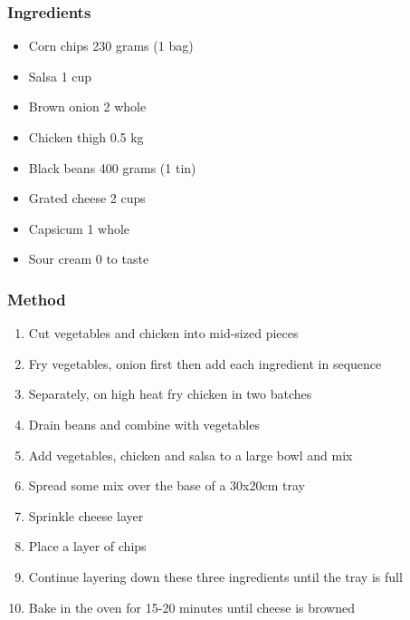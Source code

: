 \documentclass[]{article}
\begin{document}
\subsubsection*{\Large Ingredients}
\begin{multicols}{2}
\begin{itemize}
 \item Corn chips \hfill 230 grams (1 bag)
 \item Salsa \hfill 1 cup
 \item Brown onion \hfill 2 whole
 \item Chicken thigh \hfill 0.5 kg
 \item Black beans \hfill 400 grams (1 tin)
 \item Grated cheese \hfill 2 cups
 \item Capsicum \hfill 1 whole
 \item Sour cream \hfill 0 to taste
\end{itemize}
\end{multicols}
\subsubsection*{\Large Method}
\begin{enumerate}[font=\huge\color{accent}]
	\item Cut vegetables and chicken into mid-sized pieces
	\item Fry vegetables, onion first then add each ingredient in sequence
	\item Separately, on high heat fry chicken in two batches
	\item Drain beans and combine with vegetables
	\item Add vegetables, chicken and salsa to a large bowl and mix
	\item Spread some mix over the base of a 30x20cm tray
	\item Sprinkle cheese layer
	\item Place a layer of chips
	\item Continue layering down these three ingredients until the tray is full
	\item Bake in the oven for 15-20 minutes until cheese is browned
\end{enumerate}
\newpage
{}\label{rec:Tuna Pasta Bake}
\end{document}
